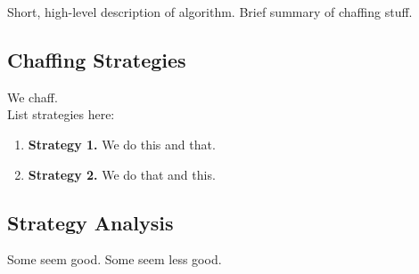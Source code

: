 Short, high-level description of algorithm. Brief summary of chaffing stuff.

\subsection*{Chaffing Strategies}

We chaff.\\

List strategies here:\\
\begin{enumerate}
  \item \textbf{Strategy 1.} We do this and that.
  \item \textbf{Strategy 2.} We do that and this. 
\end{enumerate}

\subsection*{Strategy Analysis}
Some seem good. Some seem less good.


